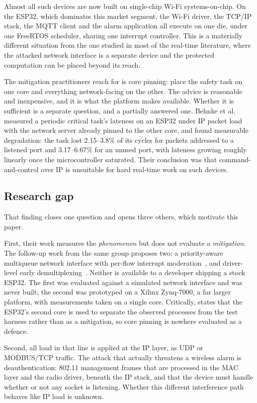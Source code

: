 Almost all such devices are now built on single-chip Wi-Fi systems-on-chip. On the ESP32, which
dominates this market segment, the Wi-Fi driver, the TCP/IP stack, the MQTT client and the alarm
application all execute on one die, under one FreeRTOS scheduler, sharing one interrupt
controller. This is a materially different situation from the one studied in most of the
real-time literature, where the attacked network interface is a separate device and the protected
computation can be placed beyond its reach.

The mitigation practitioners reach for is core pinning: place the safety task on one core and
everything network-facing on the other. The advice is reasonable and inexpensive, and it is what
the platform makes available. Whether it is sufficient is a separate question, and a partially
answered one. Behnke et al.~\cite{behnke2020} measured a periodic critical task's lateness on an
ESP32 under IP packet load with the network server already pinned to the other core, and found
measurable degradation: the task lost 2.15--3.8\% of its cycles for packets addressed to a
listened port and 3.17--6.67\% for an unused port, with lateness growing roughly linearly once
the microcontroller saturated. Their conclusion was that command-and-control over IP is
unsuitable for hard real-time work on such devices.

\subsection{Research gap}

That finding closes one question and opens three others, which motivate this paper.

First, their work measures the \emph{phenomenon} but does not evaluate a \emph{mitigation}. The
follow-up work from the same group proposes two: a priority-aware multiqueue network interface
with per-flow interrupt moderation~\cite{behnke2022}, and driver-level early
demultiplexing~\cite{behnke2023}. Neither is available to a developer shipping a stock ESP32. The
first was evaluated against a simulated network interface and was never built; the second was
prototyped on a Xilinx Zynq-7000, a far larger platform, with measurements taken on a single
core. Critically, \cite{behnke2023} states that the ESP32's second core is used to separate the
observed processes from the test harness rather than as a mitigation, so core pinning is nowhere
evaluated as a defence.

Second, all load in that line is applied at the IP layer, as UDP or MODBUS/TCP traffic. The
attack that actually threatens a wireless alarm is deauthentication: 802.11 management frames
that are processed in the MAC layer and the radio driver, beneath the IP stack, and that the
device must handle whether or not any socket is listening. Whether this different interference
path behaves like IP load is unknown.

